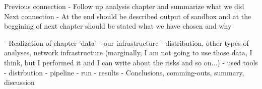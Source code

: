  


Previous connection
- Follow up analysis chapter and summarize what we did
Next connection
- At the end should be described output of sandbox and at the beggining of next chapter should be stated what we have chosen and why



- Realization of chapter 'data'
- our infrastructure - distribution, other types of analyses, network infrastructure (marginally, I am not going to use those data, I think, but I performed it and I can write about the risks and so on...)
- used tools
- distrbution
- pipeline
- run
- results
- Conclusions, comming-outs, summary, discussion